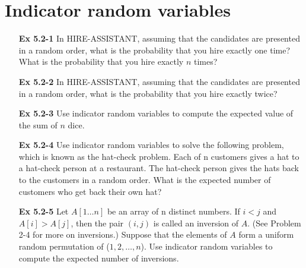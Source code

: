 \documentclass[fontsize=12pt,paper=a4]{book}
\begin{document}
\section{Indicator random variables}
\begin{enumerate}
	\item[\textbf{Ex 5.2-1}]
		In HIRE-ASSISTANT, assuming that the candidates are presented in a random order, what is the probability that you hire exactly one time? What is the probability that you hire exactly $n$ times?
		
	\item[\textbf{Ex 5.2-2}]
		In HIRE-ASSISTANT, assuming that the candidates are presented in a random order, what is the probability that you hire exactly twice?
		
	\item[\textbf{Ex 5.2-3}]
		Use indicator random variables to compute the expected value of the sum of $n$ dice.
		
	\item[\textbf{Ex 5.2-4}]
		Use indicator random variables to solve the following problem, which is known as the hat-check problem. Each of n customers gives a hat to a hat-check person at a restaurant. The hat-check person gives the hats back to the customers in a random order. What is the expected number of customers who get back their own hat?

	\item[\textbf{Ex 5.2-5}]
		Let $A[1 \dots n]$ be an array of n distinct numbers. If $i < j$ and $A[i] > A[j]$, then the pair $(i, j)$ is called an inversion of $A$. (See Problem 2-4 for more on inversions.) Suppose that the elements of $A$ form a uniform random permutation of ($1, 2, \dots , n$). Use indicator random variables to compute the expected number of inversions.

\end{enumerate}
\end{document}
